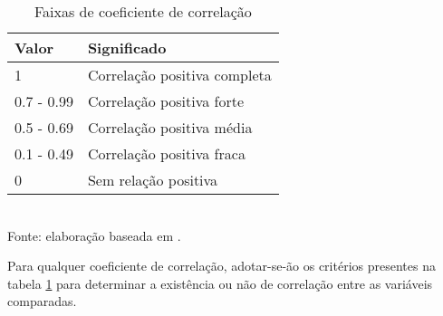 \begin{table}[H]
	\centering
	\label{tab:faixas-coeficiente-correlacao}
	\caption{Faixas de coeficiente de correlação}
	\begin{tabular}{@{}lp{6cm}@{}}
		\toprule
		Valor      & Significado                  \\ \midrule
		1          & Correlação positiva completa \\ \midrule
		0.7 - 0.99 & Correlação positiva forte    \\ \midrule
		0.5 - 0.69 & Correlação positiva média    \\ \midrule
		0.1 - 0.49 & Correlação positiva fraca    \\ \midrule
		0          & Sem relação positiva         \\ \bottomrule
	\end{tabular}
	\\ \footnotesize{Fonte: elaboração baseada em \cite{ali2022spearman}.}
\end{table}

Para qualquer coeficiente de correlação, adotar-se-ão os critérios presentes na tabela \ref{tab:faixas-coeficiente-correlacao} para determinar a existência ou não de correlação entre as variáveis comparadas.